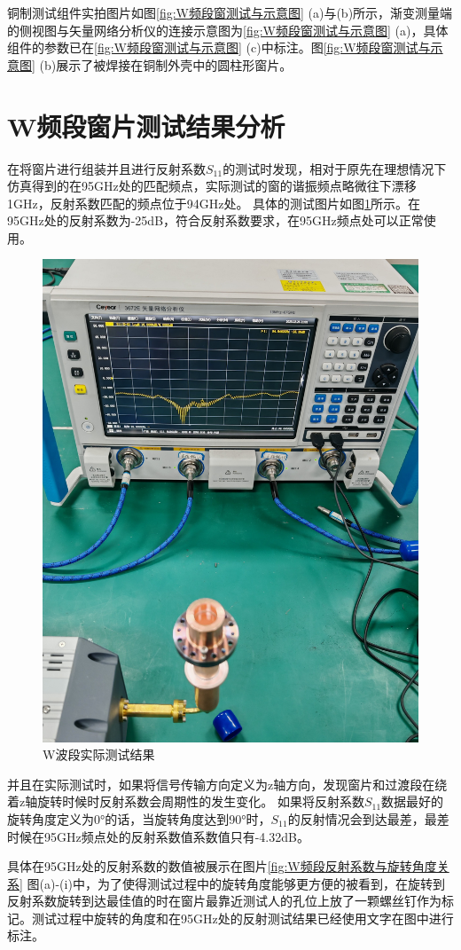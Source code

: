 \documentclass[master]{thesis-uestc}
\begin{document}
铜制测试组件实拍图片如图\ref{fig:W频段窗测试与示意图} (a)与(b)所示，渐变测量端的侧视图与矢量网络分析仪的连接示意图为\ref{fig:W频段窗测试与示意图} (a)，具体组件的参数已在\ref{fig:W频段窗测试与示意图} (c)中标注。图\ref{fig:W频段窗测试与示意图} (b)展示了被焊接在铜制外壳中的圆柱形窗片。

\section{W频段窗片测试结果分析}
在将窗片进行组装并且进行反射系数$S_{11}$的测试时发现，相对于原先在理想情况下仿真得到的在95GHz处的匹配频点，实际测试的窗的谐振频点略微往下漂移1GHz，反射系数匹配的频点位于94GHz处。
具体的测试图片如图\ref{fig:W波段实际测试结果}所示。在95GHz处的反射系数为-25dB，符合反射系数要求，在95GHz频点处可以正常使用。
\begin{figure}[!htb]
    \centering
    \includegraphics[width=0.35\linewidth]{pic/chapter5/实际测试的W波导窗.jpg}
    \caption{W波段实际测试结果}
    \label{fig:W波段实际测试结果}
\end{figure}

并且在实际测试时，如果将信号传输方向定义为z轴方向，发现窗片和过渡段在绕着z轴旋转时候时反射系数会周期性的发生变化。
如果将反射系数$S_{11}$数据最好的旋转角度定义为0°的话，当旋转角度达到90°时，$S_{11}$的反射情况会到达最差，最差时候在95GHz频点处的反射系数值系数值只有-4.32dB。

具体在95GHz处的反射系数的数值被展示在图片\ref{fig:W频段反射系数与旋转角度关系} 图(a)-(i)中，为了使得测试过程中的旋转角度能够更方便的被看到，在旋转到反射系数旋转到达最佳值的时在窗片最靠近测试人的孔位上放了一颗螺丝钉作为标记。测试过程中旋转的角度和在95GHz处的反射测试结果已经使用文字在图中进行标注。
\end{document}
